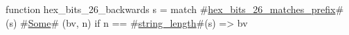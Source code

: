 function hex_bits_26_backwards s =
  match #\hyperref[sailRISCVzhexzybitszy26zymatcheszyprefix]{hex\_bits\_26\_matches\_prefix}#(s) {
      #\hyperref[sailRISCVzSome]{Some}# (bv, n) if n == #\hyperref[sailRISCVzstringzylength]{string\_length}#(s) => bv
  }
